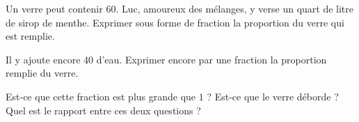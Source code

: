 
\begin{exercice}\label{exosmath-0802}

    Un verre peut contenir \unit{60}{\centi\liter}. Luc, amoureux des mélanges, y verse un quart de litre de sirop de menthe. Exprimer sous forme de fraction la proportion du verre qui est remplie.

    Il y ajoute encore \unit{40}{\centi\liter} d'eau. Exprimer encore par une fraction la proportion remplie du verre.

    Est-ce que cette fraction est plus grande que \( 1\) ? Est-ce que le verre déborde ? Quel est le rapport entre ces deux questions ?

\end{exercice}
